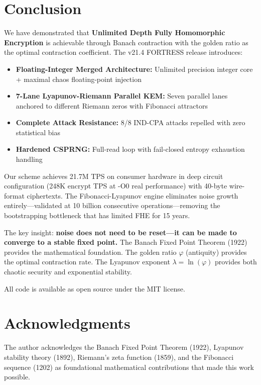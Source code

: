 \documentclass[11pt,a4paper]{article}
\begin{document}
\section{Conclusion}

We have demonstrated that \textbf{Unlimited Depth Fully Homomorphic Encryption} is achievable through Banach contraction with the golden ratio as the optimal contraction coefficient. The v21.4 FORTRESS release introduces:

\begin{itemize}
\item \textbf{Floating-Integer Merged Architecture:} Unlimited precision integer core + maximal chaos floating-point injection
\item \textbf{7-Lane Lyapunov-Riemann Parallel KEM:} Seven parallel lanes anchored to different Riemann zeros with Fibonacci attractors
\item \textbf{Complete Attack Resistance:} 8/8 IND-CPA attacks repelled with zero statistical bias
\item \textbf{Hardened CSPRNG:} Full-read loop with fail-closed entropy exhaustion handling
\end{itemize}

Our scheme achieves 21.7M TPS on consumer hardware in deep circuit configuration (248K encrypt TPS at -O0 real performance) with 40-byte wire-format ciphertexts. The Fibonacci-Lyapunov engine eliminates noise growth entirely—validated at 10 billion consecutive operations—removing the bootstrapping bottleneck that has limited FHE for 15 years.

The key insight: \textbf{noise does not need to be reset—it can be made to converge to a stable fixed point.} The Banach Fixed Point Theorem (1922) provides the mathematical foundation. The golden ratio $\varphi$ (antiquity) provides the optimal contraction rate. The Lyapunov exponent $\lambda = \ln(\varphi)$ provides both chaotic security and exponential stability.

All code is available as open source under the MIT license.

\section*{Acknowledgments}
The author acknowledges the Banach Fixed Point Theorem (1922), Lyapunov stability theory (1892), Riemann's zeta function (1859), and the Fibonacci sequence (1202) as foundational mathematical contributions that made this work possible.
\end{document}
